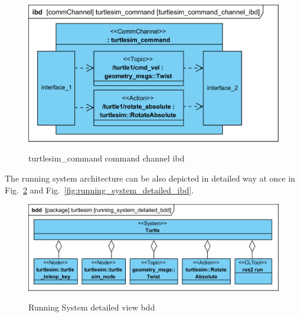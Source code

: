 \documentclass[11pt,oneside,a4paper]{report}
\begin{document}
\begin{figure}[H]
	\centering
	\begin{center}
		{\includegraphics[scale=1.0]{diagrams/turtlesim_command_channel_ibd.png}}
	\end{center}
	\caption{turtlesim\_command command channel ibd}
	\label{fig:turtlesim_command_channel_ibd}
\end{figure}
			
\pagebreak			
			
The running system architecture can be also depicted in detailed way at once in Fig.~\ref{fig:running_system_detailed_bdd} and Fig.~\ref{fig:running_system_detailed_ibd}.
			
\begin{figure}[H]
	\centering
	\begin{center}
		{\includegraphics[scale=.9]{diagrams/running_system_detailed_bdd.png}}
	\end{center}
	\caption{Running System detailed view bdd}
	\label{fig:running_system_detailed_bdd}
\end{figure}
\end{document}
